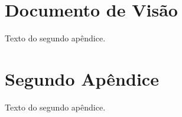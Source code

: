 \begin{apendicesenv}

\partapendices

\chapter{Documento de Visão}
Texto do segundo apêndice.

\chapter{Segundo Apêndice}

Texto do segundo apêndice.

\end{apendicesenv}
